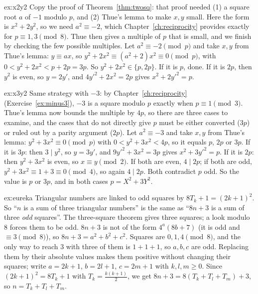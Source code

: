 \begin{solution}{ex:x2y2}
\idea Copy the proof of Theorem~\ref{thm:twosq}: that proof needed (1) a square root $a$ of $-1$ modulo $p$, and (2) Thue's lemma to make $x,y$ small. Here the form is $x^2+2y^2$, so we need $a^2\equiv-2$, which Chapter~\ref{ch:reciprocity} provides exactly for $p\equiv1,3\pmod8$. Thue then gives a multiple of $p$ that is small, and we finish by checking the few possible multiples.
\writeup Let $a^2\equiv-2\pmod p$ and take $x,y$ from Thue's lemma: $y\equiv ax$, so $y^2+2x^2\equiv(a^2+2)x^2\equiv0\pmod p$, with $0<y^2+2x^2<p+2p=3p$. So $y^2+2x^2\in\{p,2p\}$. If it is $p$, done. If it is $2p$, then $y^2$ is even, so $y=2y'$, and $4y'^2+2x^2=2p$ gives $x^2+2y'^2=p$.
\end{solution}

\begin{solution}{ex:x3y2}
\idea Same strategy with $-3$: by Chapter~\ref{ch:reciprocity} (Exercise~\ref{ex:minus3}), $-3$ is a square modulo $p$ exactly when $p\equiv1\pmod3$. Thue's lemma now bounds the multiple by $4p$, so there are three cases to examine, and the cases that do not directly give $p$ must be either converted ($3p$) or ruled out by a parity argument ($2p$).
\writeup Let $a^2\equiv-3$ and take $x,y$ from Thue's lemma: $y^2+3x^2\equiv0\pmod p$ with $0<y^2+3x^2<4p$, so it equals $p$, $2p$ or $3p$.
If it is $3p$: then $3\mid y^2$, so $y=3y'$, and $9y'^2+3x^2=3p$ gives $x^2+3y'^2=p$.
If it is $2p$: then $y^2+3x^2$ is even, so $x\equiv y\pmod2$. If both are even, $4\mid2p$; if both are odd, $y^2+3x^2\equiv1+3\equiv0\pmod4$, so again $4\mid2p$. Both contradict $p$ odd. So the value is $p$ or $3p$, and in both cases $p=X^2+3Y^2$.
\end{solution}

\begin{solution}{ex:eureka}
\idea Triangular numbers are linked to odd squares by $8T_k+1=(2k+1)^2$. So ``$n$ is a sum of three triangular numbers'' is the same as ``$8n+3$ is a sum of three \emph{odd} squares''. The three-square theorem gives three squares; a look modulo $8$ forces them to be odd.
\writeup $8n+3$ is not of the form $4^a(8b+7)$ (it is odd and $\equiv3\pmod8$), so $8n+3=a^2+b^2+c^2$. Squares are $0,1,4\pmod8$, and the only way to reach $3$ with three of them is $1+1+1$, so $a,b,c$ are odd. Replacing them by their absolute values makes them positive without changing their squares; write $a=2k+1$, $b=2l+1$, $c=2m+1$ with $k,l,m\ge0$. Since $(2k+1)^2=8T_k+1$ with $T_k=\frac{k(k+1)}2$, we get $8n+3=8(T_k+T_l+T_m)+3$, so $n=T_k+T_l+T_m$.
\end{solution}

